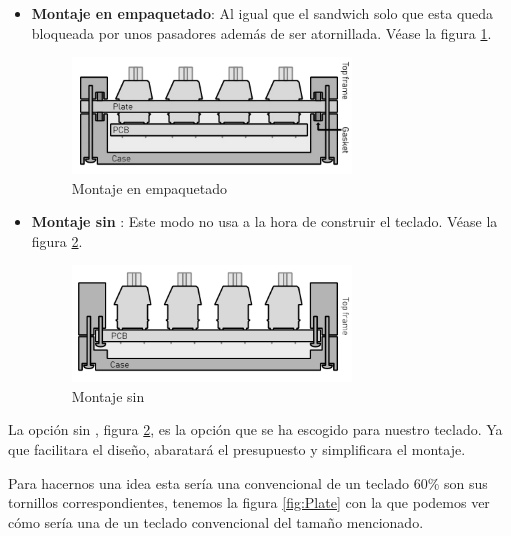 \begin{itemize}
    \item \textbf{Montaje en empaquetado}: Al igual que el sandwich solo que esta queda bloqueada por unos pasadores además de ser atornillada. Véase  la figura \ref{fig:Montaje6}.
    \begin{figure}[H]
        \centering
        \includegraphics[width=0.7\textwidth]{imagenes/Capitulos/Cap03/Montajes/Montaje6.png}
        \caption{Montaje en empaquetado \cite{Keyboards-Mounting-Styles}}
        \label{fig:Montaje6}
    \end{figure}
    
    \item \textbf{Montaje sin }: Este modo no usa  a la hora de construir el teclado. Véase  la figura \ref{fig:Montaje7}.
    \begin{figure}[H]
        \centering
        \includegraphics[width=0.7\textwidth]{imagenes/Capitulos/Cap03/Montajes/Montaje7.png}
        \caption{Montaje sin  \cite{Keyboards-Mounting-Styles}}
        \label{fig:Montaje7}
    \end{figure}
    
\end{itemize}
\newpage
La opción sin , figura \ref{fig:Montaje7}, es la opción que se ha escogido para nuestro teclado. Ya que facilitara el diseño, abaratará el presupuesto y simplificara el montaje.

Para hacernos una idea esta sería una  convencional de un teclado 60\% son sus tornillos correspondientes, tenemos la figura \ref{fig:Plate} con la que podemos ver cómo sería una  de un teclado convencional del tamaño mencionado.

